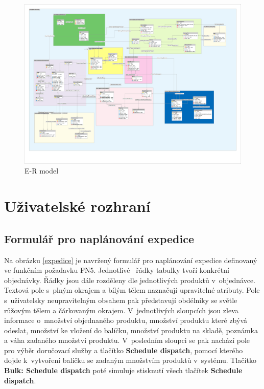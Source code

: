 \documentclass[thesis=B,czech]{FITthesis}[2012/06/26]
\begin{document}
\begin{figure}
	\includegraphics[width=500pt, height=\textwidth, angle=90]{mahasys_ermodel.png}
	\caption{E-R model}\label{er_model}
\end{figure}



\section{Uživatelské rozhraní}

\subsection{Formulář pro naplánování expedice}
	Na obrázku \ref{expedice} je navržený formulář pro naplánování expedice definovaný ve funkčním požadavku FN5. Jednotlivé ~řádky tabulky tvoří konkrétní objednávky. Řádky jsou dále rozděleny dle jednotlivých produktů v~objednávce. Textová pole s~plným okrajem a bílým tělem naznačují upravitelné atributy. Pole s~uživatelsky neupravitelným obsahem pak představují obdélníky se světle růžovým tělem a čárkovaným okrajem. V~jednotlivých sloupcích jsou zleva informace o~množství objednaného produktu, množství produktu které zbývá odeslat, množství ke vložení do balíčku, množství produktu na skladě, poznámka a váha zadaného množství produktu. V~posledním sloupci se pak nachází pole pro výběr doručovací služby a tlačítko \textbf{Schedule dispatch}, pomocí kterého dojde k~vytvoření balíčku se zadaným množstvím produktů v~systému. Tlačítko \textbf{Bulk: Schedule dispatch} poté simuluje stisknutí všech tlačítek \textbf{Schedule dispatch}.
\end{document}
